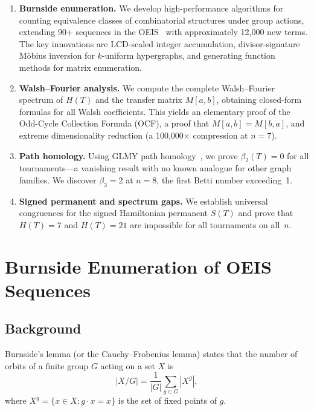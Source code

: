 \documentclass[12pt,reqno]{amsart}
\theoremstyle{plain}
\theoremstyle{definition}
\theoremstyle{remark}
\begin{document}
\begin{enumerate}
\item \textbf{Burnside enumeration.} We develop high-performance algorithms
for counting equivalence classes of combinatorial structures under group actions,
extending 90+ sequences in the OEIS~\cite{OEIS} with approximately 12{,}000 new terms.
The key innovations are LCD-scaled integer accumulation, divisor-signature
M\"obius inversion for $k$-uniform hypergraphs, and generating function methods
for matrix enumeration.

\item \textbf{Walsh--Fourier analysis.} We compute the complete Walsh--Fourier
spectrum of $H(T)$ and the transfer matrix $M[a,b]$, obtaining closed-form
formulas for all Walsh coefficients. This yields an elementary proof of the
Odd-Cycle Collection Formula (OCF), a proof that $M[a,b] = M[b,a]$, and extreme
dimensionality reduction (a 100{,}000$\times$ compression at $n = 7$).

\item \textbf{Path homology.} Using GLMY path homology~\cite{GLMY2012}, we prove
$\beta_2(T) = 0$ for all tournaments---a vanishing result with no known
analogue for other graph families. We discover $\beta_3 = 2$ at $n = 8$,
the first Betti number exceeding~1.

\item \textbf{Signed permanent and spectrum gaps.} We establish universal
congruences for the signed Hamiltonian permanent $S(T)$ and prove that
$H(T) = 7$ and $H(T) = 21$ are impossible for all tournaments on all~$n$.
\end{enumerate}

\section{Burnside Enumeration of OEIS Sequences}\label{sec:enumeration}

\subsection{Background}

Burnside's lemma (or the Cauchy--Frobenius lemma) states that the number of
orbits of a finite group $G$ acting on a set $X$ is
\[
|X/G| = \frac{1}{|G|} \sum_{g \in G} |X^g|,
\]
where $X^g = \{x \in X : g \cdot x = x\}$ is the set of fixed points of $g$.
\end{document}

